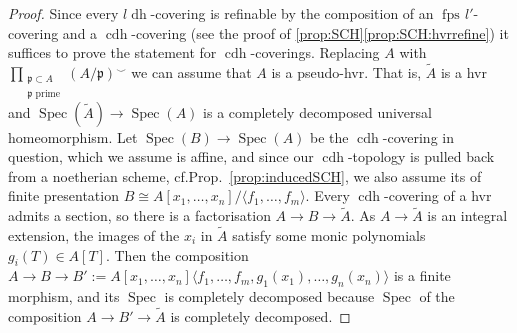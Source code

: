 \documentclass[10pt]{amsart}
\theoremstyle{definition}
\newcommand{\p}{\mathfrak{p}}
\DeclareMathOperator{\Spec}{Spec}
\newcommand{\fpsl}{{\operatorname{fps\!}l'}}
\newcommand{\cdh}{{{\operatorname{cdh}}}}
\newcommand{\ldh}{{l{\operatorname{dh}}}}
\newcommand{\cduh}{\operatorname{cduh}}
\begin{document}
\begin{proof}
Since every $\ldh$-covering is refinable by the composition of an $\fpsl$-covering and a $\cdh$-covering (see the proof of \ref{prop:SCH}\eqref{prop:SCH:hvrrefine}) it suffices to prove the statement for $\cdh$-coverings. %
Replacing $A$ with $\prod_{\substack{\p \subset A \\ \p \textrm{ prime}}} (A/\p)^\smallsmile$ we can assume that $A$ is a pseudo-hvr. That is, $\widetilde{A}$ is a hvr and $\Spec(\widetilde{A}) \to \Spec(A)$ is a completely decomposed universal homeomorphism. Let $\Spec(B) \to \Spec(A)$ be the $\cdh$-covering in question, which we assume is affine, and since our $\cdh$-topology is pulled back from a noetherian scheme, cf.Prop.~\ref{prop:inducedSCH}, we also assume its of finite presentation $B \cong A[x_1, \dots, x_n] / \langle f_1, \dots, f_m\rangle$. Every $\cdh$-covering of a hvr admits a section, so there is a factorisation $A \to B \to \widetilde{A}$. As $A \to \widetilde{A}$ is an integral extension, the images of the $x_i$ in $\widetilde{A}$ satisfy some monic polynomials $g_i(T) \in A[T]$. Then the composition $A \to B \to B' := A[x_1, \dots, x_n] \langle f_1, \dots, f_m, g_1(x_1), \dots, g_n(x_n)\rangle$ is a finite morphism, and its $\Spec$ is completely decomposed because $\Spec$ of the composition $A \to B' \to \widetilde{A}$ is completely decomposed.

\end{proof}
\end{document}
